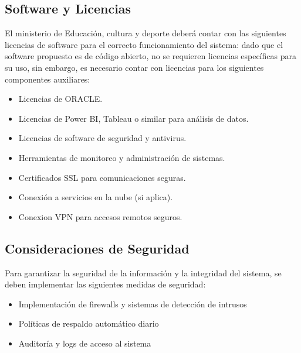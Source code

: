 \subsection{Software y Licencias}
El ministerio de Educación, cultura y deporte deberá contar con las siguientes licencias de software para el correcto funcionamiento del sistema:
dado que el software propuesto es de código abierto, no se requieren licencias específicas para su uso, sin embargo, es necesario contar con licencias para los siguientes componentes auxiliares:
\begin{itemize}
    \item Licencias de ORACLE.
    \item Licencias de Power BI, Tableau o similar para análisis de datos.
    \item Licencias de software de seguridad y antivirus.
    \item Herramientas de monitoreo y administración de sistemas.
    \item Certificados SSL para comunicaciones seguras.
    \item Conexión a servicios en la nube (si aplica).
    \item Conexion VPN para accesos remotos seguros.
\end{itemize}

\subsection{Consideraciones de Seguridad}

Para garantizar la seguridad de la información y la integridad del sistema, se deben implementar las siguientes medidas de seguridad:

\begin{itemize}
    \item Implementación de firewalls y sistemas de detección de intrusos
    \item Políticas de respaldo automático diario
    \item Auditoría y logs de acceso al sistema
\end{itemize}